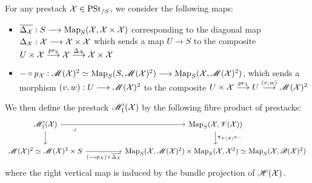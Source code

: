 \documentclass[11pt]{amsart}
\begin{document}
\begin{cns}
\label{cns:mod-prest-arr-sec}
For any prestack $\mathcal{X} \in \mathrm{PSt}_{/S}$, we consider the following maps:
\begin{itemize}
\item $\ol{\Delta_\mcX} : S \to \Map_S(\mcX, \mcX \times \mcX)$
  corresponding to the diagonal map $\Delta_\mcX : \mcX \to \mcX \times \mcX$
  which sends a map $U \to S$ to the composite
  $U \times \mcX \to[pr_2] \mcX \to[\Delta_\mcX] \mcX \times \mcX$
\item $- \circ p_\mcX : \sM(\mcX)^2 \simeq \Map_S(S, \sM(\mcX)^2)
  \to \Map_S(\mcX, \sM(\mcX)^2)$, which sends a morphism
  $(v, w) : U \to \sM(\mcX)^2$ to the composite
  $U \times \mcX \to[pr_1] U \to[{(v, w)}] \sM(\mcX)^2$
\end{itemize}
We then define the prestack $\mathscr{M}_1'(\mathcal{X})$ by the following fibre product
of prestacks:
\[\begin{tikzcd}[column sep=huge]
\sM_1'(\mcX)
  \ar[r] \ar[d] \ar[rd, phantom, "\lrcorner" very near start] &
\Map_S(\mcX, \sV(\mcX))
  \ar[d, "\pi_{\sV(\mcX)} \circ -"] \\
\sM(\mcX)^2 \simeq \sM(\mcX)^2 \times S
  \ar[r, "{(- \circ p_{\mcX}) \times \ol{\Delta_\mcX}}" below] &
\Map_S(\mcX, \sM(\mcX)^2) \times \Map_S(\mcX, \mcX^2) \simeq
\Map_S(\mcX, \sB(\mcX)^2)
\end{tikzcd}\]
where the right vertical map is induced by the bundle projection of
$\mathscr{H}(\mathcal{X})$.
\end{cns}
\end{document}
